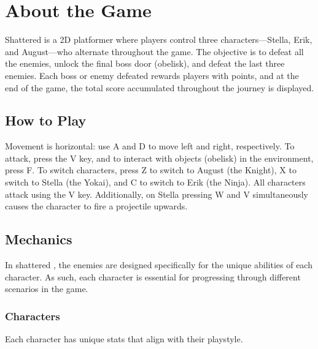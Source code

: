 
\section{About the Game}

Shattered is a 2D platformer where players control three characters—Stella, Erik, and August—who alternate throughout the game. The objective is to defeat all the enemies, unlock the final boss door (obelisk), and defeat the last three enemies. Each boss or enemy defeated rewards players with points, and at the end of the game, the total score accumulated throughout the journey is displayed.

\subsection{How to Play}

Movement is horizontal: use A and D to move left and right, respectively. To attack, press the V key, and to interact with objects (obelisk) in the environment, press F. To switch characters, press Z to switch to August (the Knight), X to switch to Stella (the Yokai), and C to switch to Erik (the Ninja). All characters attack using the V key. Additionally, on Stella pressing  W and V simultaneously causes the character to fire a projectile upwards.


\subsection{Mechanics}

In shattered \cite{ground}, the enemies are designed specifically for the unique abilities of each character. As such, each character is essential for progressing through different scenarios in the game.
\subsubsection{Characters}
Each character has unique stats that align with their playstyle.


